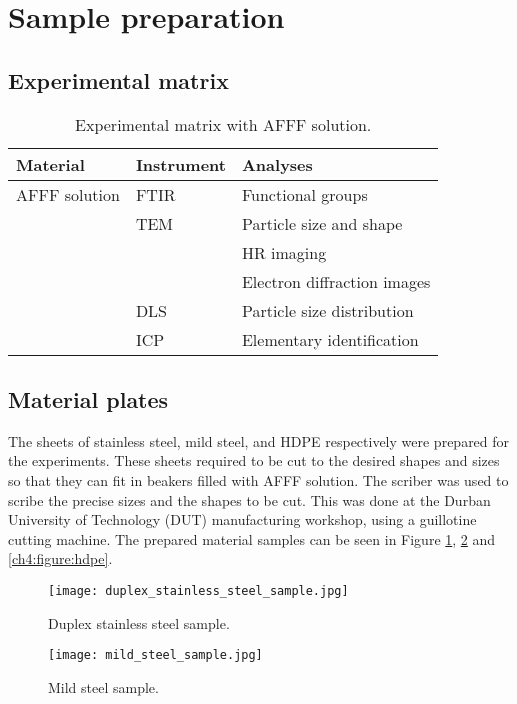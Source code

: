 \section{Sample preparation}
\subsection{Experimental matrix}

\begin{table}[H]

\centering
\begin{tabular}{m{} m{} m{}}
    \hline
    Material & Instrument & Analyses \\
    \hline
    AFFF solution & FTIR & Functional groups \\
    & TEM & Particle size and shape \\
    & & HR imaging \\
    & & Electron diffraction images \\
    & DLS & Particle size distribution \\
    & ICP & Elementary identification \\
    \hline
\end{tabular}

\caption{Experimental matrix with AFFF solution.}
\end{table}

\subsection{Material plates} 
The sheets of stainless steel, mild steel, and HDPE respectively were prepared for the experiments. These sheets required to be cut to the desired shapes and sizes so that they can fit in beakers filled with AFFF solution. The scriber was used to scribe the precise sizes and the shapes to be cut. This was done at the Durban University of Technology (DUT) manufacturing workshop, using a guillotine cutting machine. The prepared material samples can be seen in Figure \ref{ch4:figure:stainless_steel}, \ref{ch4:figure:mild_steel} and \ref{ch4:figure:hdpe}.
 
\begin{figure}[H]
    \centering
    \texttt{[image: duplex\_stainless\_steel\_sample.jpg]}
    \caption{Duplex stainless steel sample.}
    \label{ch4:figure:stainless_steel}
\end{figure}
 
\begin{figure}[H]
    \centering
    \texttt{[image: mild\_steel\_sample.jpg]}
    \caption{Mild steel sample.}
    \label{ch4:figure:mild_steel}
\end{figure}

